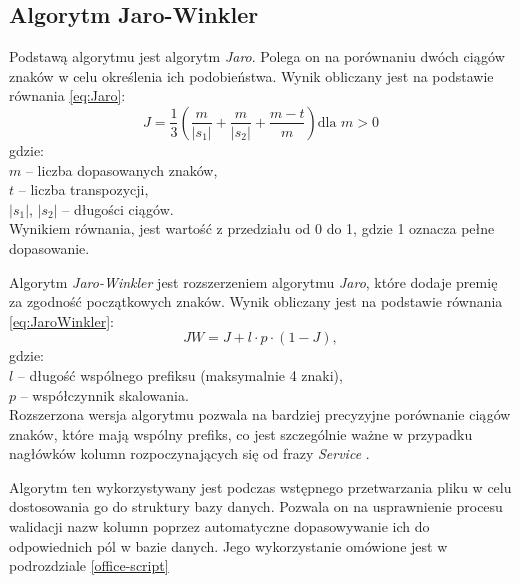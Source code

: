 \subsection{Algorytm Jaro-Winkler}
\vspace{0.1cm}
Podstawą algorytmu jest algorytm \emph{Jaro}. Polega on na porównaniu dwóch ciągów znaków w celu określenia ich podobieństwa. Wynik obliczany jest na podstawie równania \ref{eq:Jaro}:
\begin{equation}
    \label{eq:Jaro}
    J = \frac{1}{3} \left( \frac{m}{|s_1|} + \frac{m}{|s_2|} + \frac{m - t}{m} \right) \mbox{dla } m>0
\end{equation}
\noindent gdzie:\\
$m$ – liczba dopasowanych znaków,\\    $t$ – liczba transpozycji,\\    $|s_1|$, $|s_2|$ – długości ciągów.\\

\noindent Wynikiem równania, jest wartość z przedziału od 0 do 1, gdzie 1 oznacza pełne dopasowanie.

Algorytm \emph{Jaro-Winkler} jest rozszerzeniem algorytmu \emph{Jaro}, które dodaje premię za zgodność początkowych znaków. Wynik obliczany jest na podstawie równania \ref{eq:JaroWinkler}:
\begin{equation}
    \label{eq:JaroWinkler}
    JW = J + l \cdot p \cdot (1 - J),
\end{equation}
gdzie:\\
$l$ – długość wspólnego prefiksu (maksymalnie 4 znaki),\\ $p$ – współczynnik skalowania.\\

\noindent Rozszerzona wersja algorytmu pozwala na bardziej precyzyjne porównanie ciągów znaków, które mają wspólny prefiks, co jest szczególnie ważne w przypadku nagłówków kolumn rozpoczynających się od frazy \emph{Service} \cite{noauthor_jarowinkler_2024,vaid_comprehensive_2023}.

Algorytm ten wykorzystywany jest podczas wstępnego przetwarzania pliku w celu dostosowania go do struktury bazy danych. Pozwala on na usprawnienie procesu walidacji nazw kolumn poprzez automatyczne dopasowywanie ich do odpowiednich pól w bazie danych. Jego wykorzystanie omówione jest w podrozdziale \ref{office-script}